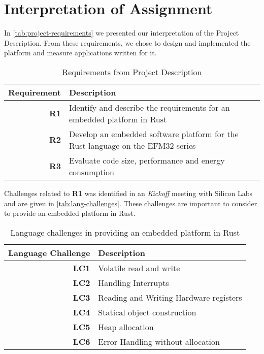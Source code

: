 \section{Interpretation of Assignment}
\label{sec:intro:assignment}

In \autoref{tab:project-requirements} we presented our interpretation of the Project Description.
From these requirements, we chose to design and implemented the {\rg} platform and measure applications written for it.

\begin{table}[H]
  \centering
  \begin{tabular}{r | p{8cm}}
    \textbf{Requirement} & \textbf{Description} \\
    \hline
    \textbf{R1} & Identify and describe the requirements for an embedded platform in Rust \\
    \textbf{R2} & Develop an embedded software platform for the Rust language on the EFM32 series \\
    \textbf{R3} & Evaluate code size, performance and energy consumption \\
    \hline
  \end{tabular}
  \caption{Requirements from Project Description}
  \label{tab:project-requirements}
\end{table}

Challenges related to \textbf{R1} was identified in an \emph{Kickoff} meeting with Silicon Labs and are given in \autoref{tab:lang-challenges}.
These challenges are important to consider to provide an embedded platform in Rust.

\begin{table}[H]
  \centering
  \begin{tabular}{r | l}
    \textbf{Language Challenge} & \textbf{Description} \\
    \hline
    \textbf{LC1} & Volatile read and write \\
    \textbf{LC2} & Handling Interrupts \\
    \textbf{LC3} & Reading and Writing Hardware registers \\
    \textbf{LC4} & Statical object construction \\
    \textbf{LC5} & Heap allocation \\
    \textbf{LC6} & Error Handling without allocation \\
    \hline
  \end{tabular}
  \caption{Language challenges in providing an embedded platform in Rust}
  \label{tab:lang-challenges}
\end{table}

